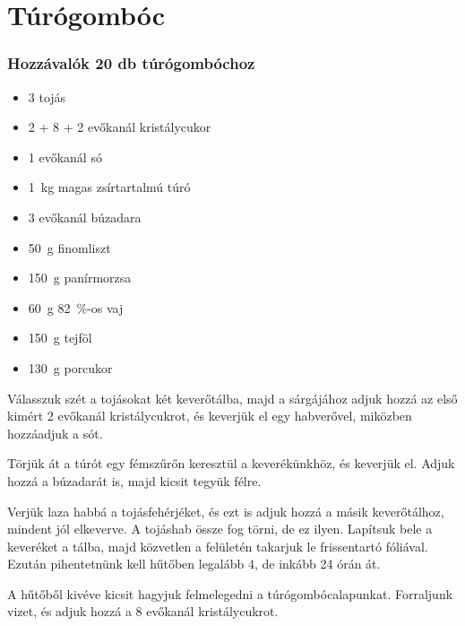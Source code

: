\newpage
\section*{Túrógombóc} \label{sec:turogomboc}

\subsubsection*{Hozzávalók 20 db túrógombóchoz}
\begin{itemize}
    \item \num{3} tojás
    \item \num{2} + \num{8} + \num{2} evőkanál kristálycukor
    \item \num{1} evőkanál só
    \item \qty{1}{\kg} magas zsírtartalmú túró
    \item \num{3} evőkanál búzadara
    \item \qty{50}{\g} finomliszt
    \item \qty{150}{\g} panírmorzsa
    \item \qty{60}{\g} \qty{82}{\percent}-os vaj
    \item \qty{150}{\g} tejföl
    \item \qty{130}{\g} porcukor
\end{itemize}

Válasszuk szét a tojásokat két keverőtálba, majd a sárgájához adjuk hozzá az első kimért \num{2} evőkanál kristálycukrot, és keverjük el egy habverővel, miközben hozzáadjuk a sót.

Törjük át a túrót egy fémszűrőn keresztül a keverékünkhöz, és keverjük el. Adjuk hozzá a búzadarát is, majd kicsit tegyük félre.

Verjük laza habbá a tojásfehérjéket, és ezt is adjuk hozzá a másik keverőtálhoz, mindent jól elkeverve. A tojáshab össze fog törni, de ez ilyen. Lapítsuk bele a keveréket a tálba, majd közvetlen a felületén takarjuk le frissentartó fóliával. Ezután pihentetnünk kell hűtőben legalább \num{4}, de inkább \num{24} órán át.

A hűtőből kivéve kicsit hagyjuk felmelegedni a túrógombócalapunkat. Forraljunk vizet, és adjuk hozzá a \num{8} evőkanál kristálycukrot.

